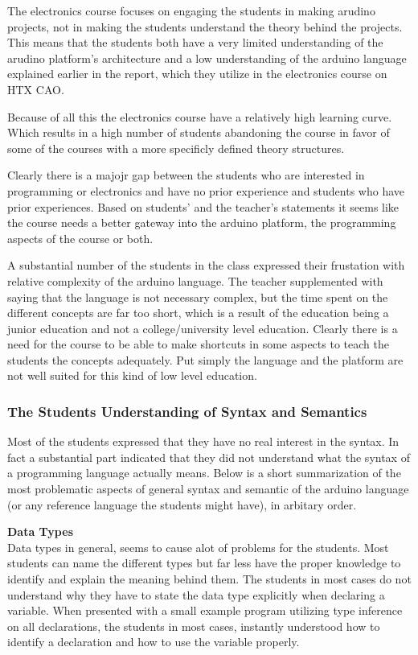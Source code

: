 The electronics course focuses on engaging the students in making arudino projects, not in making the students understand the theory behind the projects. This means that the students both have a very limited understanding of the arudino platform's architecture and a low understanding of the arduino language explained earlier in the report, which they utilize in the electronics course on HTX CAO.

Because of all this the electronics course have a relatively high learning curve. Which results in a high number of students abandoning the course in favor of some of the courses with a more specificly defined theory structures.

Clearly there is a majojr gap between the students who are interested in programming or electronics and have no prior experience and students who have prior experiences. 
Based on students' and the teacher's statements it seems like the course needs a better gateway into the arduino platform, the programming aspects of the course or both.

A substantial number of the students in the class expressed their frustation with relative complexity of the arduino language. The teacher supplemented with saying that the language is not necessary complex, but the time spent on the different concepts are far too short, which is a result of the education being a junior education and not a college/university level education.
Clearly there is a need for the course to be able to make shortcuts in some aspects to teach the students the concepts adequately. Put simply the language and the platform are not well suited for this kind of low level education.

\subsubsection{The Students Understanding of Syntax and Semantics}
Most of the students expressed that they have no real interest in the syntax. In fact a substantial part indicated that they did not understand what the syntax of a programming language actually means. Below is a short summarization of the most problematic aspects of general syntax and semantic of the arduino language (or any reference language the students might have), in arbitary order.

\textbf{Data Types}\\
Data types in general, seems to cause alot of problems for the students. Most students can name the different types but far less have the proper knowledge to identify and explain the meaning behind them. The students in most cases do not understand why they have to state the data type explicitly when declaring a variable. When presented with a small example program utilizing type inference on all declarations, the students in most cases, instantly understood how to identify a declaration and how to use the variable properly.

